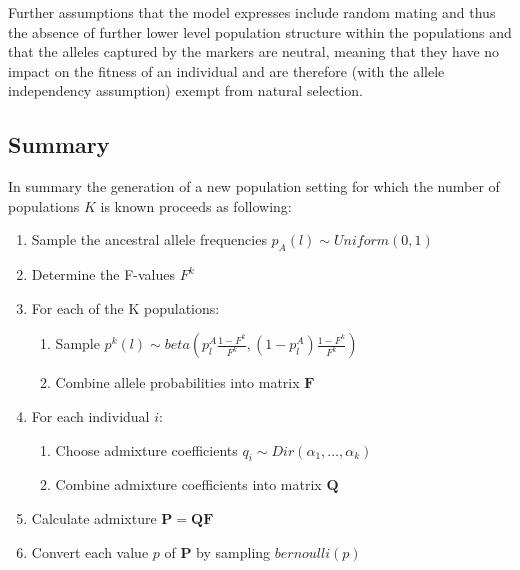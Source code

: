 \documentclass[a4paper, 11pt]{article}
\begin{document}
Further assumptions that the model expresses include random mating and thus the absence of further lower level population structure within the populations and that the alleles captured by the markers are neutral, meaning that they have no impact on the fitness of an individual and are therefore (with the allele independency assumption) exempt from natural selection.

\subsection{Summary}
In summary the generation of a new population setting for which the number of populations $K$ is known proceeds as following:
\begin{enumerate}
\item Sample the ancestral allele frequencies $p_A(l) \sim Uniform(0, 1)$
\item Determine the F-values $F^k$
\item  For each of the K populations:
\begin{enumerate}
\item Sample $p^k(l) \sim beta(p^{A}_{l} \frac{1 - F^k}{F^k}, (1-p^{A}_{l}) \frac{1 - F^k}{F^k})$
\item Combine allele probabilities into matrix $\mathbf{F}$
\end{enumerate} 
\item For each individual $i$:
\begin{enumerate}
\item Choose admixture coefficients $q_i \sim Dir(\alpha_1, \ldots, \alpha_k)$
\item Combine admixture coefficients into matrix $\mathbf{Q}$
\end{enumerate}
\item Calculate admixture $\mathbf{P} = \mathbf{Q}\mathbf{F}$
\item Convert each value $p$ of $\mathbf{P}$ by sampling $bernoulli(p)$
\end{enumerate}
\end{document}
